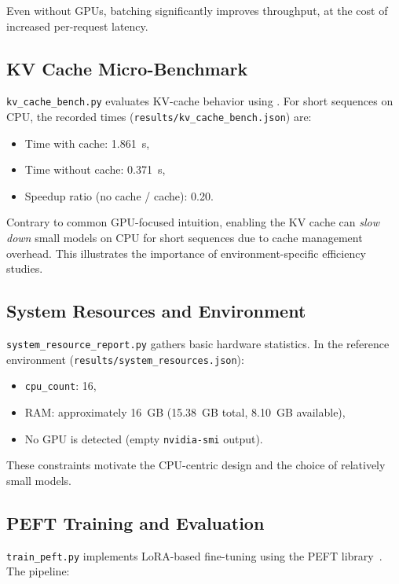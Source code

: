 \documentclass[11pt]{article}
\begin{document}
Even without GPUs, batching significantly improves throughput, at the cost of increased per-request latency.

\subsection{KV Cache Micro-Benchmark}

\verb|kv_cache_bench.py| evaluates KV-cache behavior using . For short sequences on CPU, the recorded times (\verb|results/kv_cache_bench.json|) are:

\begin{itemize}[leftmargin=1.5em]
\item Time with cache: 1.861~s,
\item Time without cache: 0.371~s,
\item Speedup ratio (no cache / cache): 0.20.
\end{itemize}

Contrary to common GPU-focused intuition, enabling the KV cache can \emph{slow down} small models on CPU for short sequences due to cache management overhead. This illustrates the importance of environment-specific efficiency studies.

\subsection{System Resources and Environment}

\verb|system_resource_report.py| gathers basic hardware statistics. In the reference environment (\verb|results/system_resources.json|):

\begin{itemize}[leftmargin=1.5em]
\item \verb|cpu_count|: 16,
\item RAM: approximately 16~GB (15.38~GB total, 8.10~GB available),
\item No GPU is detected (empty \verb|nvidia-smi| output).
\end{itemize}

These constraints motivate the CPU-centric design and the choice of relatively small models.

\subsection{PEFT Training and Evaluation}

\verb|train_peft.py| implements LoRA-based fine-tuning using the PEFT library~\citep{hu2022lora}. The pipeline:
\end{document}
